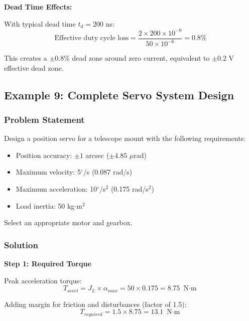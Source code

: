\textbf{Dead Time Effects:}

With typical dead time $t_d = 200$ ns:
\begin{equation}
    \text{Effective duty cycle loss} = \frac{2 \times 200 \times 10^{-9}}{50 \times 10^{-6}} = 0.8\%
\end{equation}

This creates a $\pm 0.8\%$ dead zone around zero current, equivalent to $\pm 0.2$ V effective dead zone.

\subsection{Example 9: Complete Servo System Design}

\subsubsection{Problem Statement}

Design a position servo for a telescope mount with the following requirements:
\begin{itemize}
    \item Position accuracy: $\pm 1$ arcsec ($\pm 4.85$ $\mu$rad)
    \item Maximum velocity: 5$^\circ$/s (0.087 rad/s)
    \item Maximum acceleration: 10$^\circ$/s$^2$ (0.175 rad/s$^2$)
    \item Load inertia: 50 kg$\cdot$m$^2$
\end{itemize}

Select an appropriate motor and gearbox.

\subsubsection{Solution}

\textbf{Step 1: Required Torque}

Peak acceleration torque:
\begin{equation}
    T_{accel} = J_L \times \alpha_{max} = 50 \times 0.175 = 8.75 \text{ N$\cdot$m}
\end{equation}

Adding margin for friction and disturbances (factor of 1.5):
\begin{equation}
    T_{required} = 1.5 \times 8.75 = 13.1 \text{ N$\cdot$m}
\end{equation}

